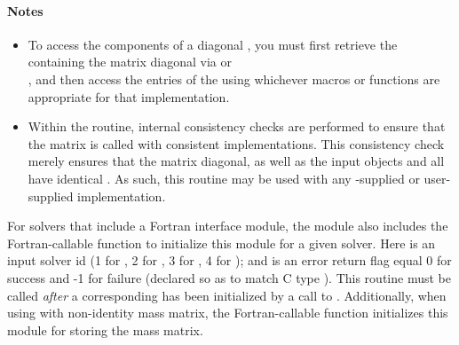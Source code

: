 \paragraph{\bf Notes}                                                      
           
\begin{itemize}
                                        
\item
  To access the components of a diagonal  , you
  must first retrieve the {\nvector} containing the matrix diagonal
  via  or\\
  , and then access the
  entries of the {\nvector} using whichever macros or functions are
  appropriate for that {\nvector} implementation.

\item
  Within the  routine, internal consistency
  checks are performed to ensure that the matrix is called with
  consistent {\nvector} implementations.  This consistency check
  merely ensures that the matrix diagonal, as well as the input 
  {\nvector} objects  and  all have
  identical .  As such, this routine may be used
  with any {\sundials}-supplied or user-supplied {\nvector}
  implementation. 

\end{itemize}

For solvers that include a Fortran interface module, the {\sunmatdiag}
module also includes the Fortran-callable
function  to initialize
this {\sunmatdiag} module for a given {\sundials} solver.
Here  is an input solver id (1 for {\cvode}, 2 for {\ida}, 3
for {\kinsol}, 4 for {\arkode}); and  is an error return flag 
equal 0 for success and -1 for failure (declared so as to match C type
).  This routine must be called \emph{after} a corresponding
{\nvector} has been initialized by a call to .
Additionally, when using {\arkode} with non-identity mass matrix, the
Fortran-callable function   
initializes this {\sunmatdiag} module for storing the mass matrix.
